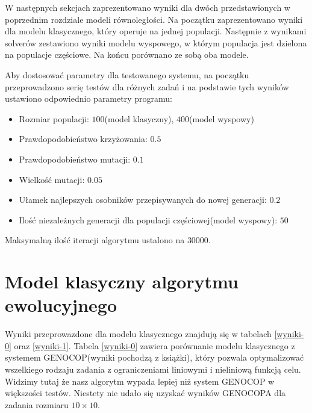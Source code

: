 W następnych sekcjach zaprezentowano wyniki dla dwóch przedstawionych w poprzednim rozdziale modeli równoległości. Na początku zaprezentowano wyniki 
dla modelu klasycznego, który operuje na jednej populacji. Następnie z wynikami solverów zestawiono wyniki modelu wyspowego, w którym 
populacja jest dzielona na populacje częściowe. Na końcu porównano ze sobą oba modele.

Aby dostosować parametry dla testowanego systemu, na początku przeprowadzono serię testów dla różnych zadań i na podstawie tych wyników ustawiono 
odpowiednio parametry programu:

\begin{itemize}
    \item Rozmiar populacji: $100$(model klasyczny), $400$(model wyspowy)
    \item Prawdopodobieństwo krzyżowania: $0.5$
    \item Prawdopodobieństwo mutacji: $0.1$
    \item Wielkość mutacji: $0.05$
    \item Ułamek najlepszych osobników przepisywanych do nowej generacji: $0.2$
    \item Ilość niezależnych generacji dla populacji częściowej(model wyspowy): $50$
\end{itemize}

Maksymalną ilość iteracji algorytmu ustalono na $30000$.

\section{Model klasyczny algorytmu ewolucyjnego}

Wyniki przeprowazdone dla modelu klasycznego znajdują się w tabelach \ref{wyniki-0} oraz \ref{wyniki-1}. Tabela \ref{wyniki-0} zawiera porównanie 
modelu klasycznego z systemem GENOCOP(wyniki pochodzą z książki\cite{ALG-GEN-BOOK}), który pozwala optymalizować wszelkiego rodzaju zadania z ograniczeniami liniowymi i nieliniową funkcją celu. 
Widzimy tutaj że nasz algorytm wypada lepiej niż system GENOCOP w większości testów. Niestety nie udało się uzyskać wyników GENOCOPA dla zadania rozmiaru 
$10 \times 10$.

\newpage

